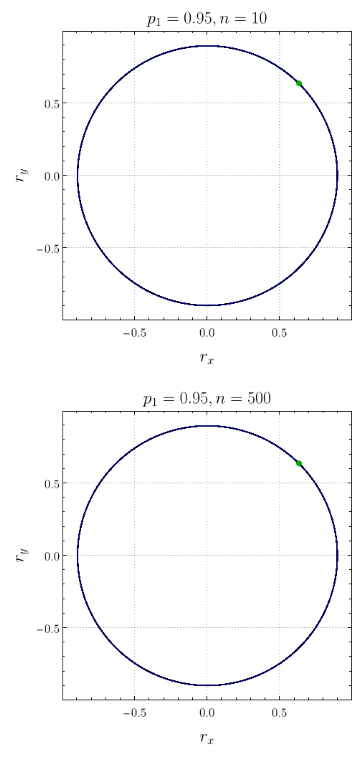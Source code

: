 \begin{figure}[ht!]
    \centering
    \begin{subfigure}{0.5\textwidth}
      \centering
      \includegraphics[width=0.9\linewidth]{chapter3/figures_separable/local_all_ran_p=0.95_r=0.9_n=10_a=-3_b=3.png}
    \end{subfigure}%
    \begin{subfigure}{0.5\textwidth}
      \centering
      \includegraphics[width=0.9\linewidth]{chapter3/figures_separable/local_all_ran_p=0.95_r=0.9_n=500_a=-3_b=3.png}

\end{subfigure}
\end{figure}
